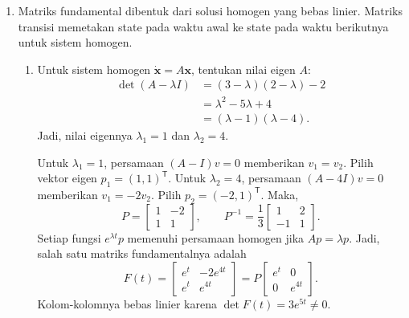 \documentclass[11pt,a4paper]{article}
\newcommand{\xx}{\mathbf{x}}
\begin{document}
\begin{enumerate}[itemsep=12pt,parsep=5pt]
  \item Matriks fundamental dibentuk dari solusi homogen yang bebas linier.
        Matriks transisi memetakan state pada waktu awal ke state pada waktu berikutnya untuk sistem homogen.
        \begin{enumerate}
          \item Untuk sistem homogen $\dot{\xx}=A\xx$, tentukan nilai eigen $A$:
                \begin{align*}
                  \det(A-\lambda I)
                    &=(3-\lambda)(2-\lambda)-2\\
                    &=\lambda^2-5\lambda+4\\
                    &=(\lambda-1)(\lambda-4).
                \end{align*}
                Jadi, nilai eigennya $\lambda_1=1$ dan $\lambda_2=4$.

                Untuk $\lambda_1=1$, persamaan $(A-I)v=0$ memberikan $v_1=v_2$.
                Pilih vektor eigen $p_1=(1,1)^{\mathsf T}$.
                Untuk $\lambda_2=4$, persamaan $(A-4I)v=0$ memberikan $v_1=-2v_2$.
                Pilih $p_2=(-2,1)^{\mathsf T}$.
                Maka,
                \[
                  P=\begin{bmatrix}1&-2\\1&1\end{bmatrix},\qquad
                  P^{-1}=\frac13\begin{bmatrix}1&2\\-1&1\end{bmatrix}.
                \]
                Setiap fungsi $e^{\lambda t}p$ memenuhi persamaan homogen jika $Ap=\lambda p$.
                Jadi, salah satu matriks fundamentalnya adalah
                \[
                  F(t)=\begin{bmatrix}e^t&-2e^{4t}\\e^t&e^{4t}\end{bmatrix}
                      =P\begin{bmatrix}e^t&0\\0&e^{4t}\end{bmatrix}.
                \]
                Kolom-kolomnya bebas linier karena $\det F(t)=3e^{5t}\ne0$.


\end{enumerate}
\end{enumerate}
\end{document}

